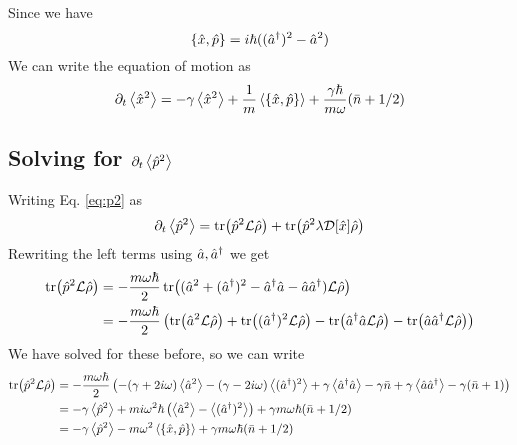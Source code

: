 Since we have
\begin{equation}
    \acomm{\xop}{\pop} = i\hbar ((\ad)^2 - \a^2)
\end{equation}
We can write the equation of motion as
\begin{equation}
    \dt\expval{\xop^2} = - \gamma \expval{\xop^2} + \frac{1}{m}\expval{\acomm{\xop}{\pop}} + \frac{\gamma \hbar}{m\omega}(\nbar + 1/2)
\end{equation}

\subsection{Solving for $\partial_t\expval{\hat{p}^2}$}
Writing Eq. \eqref{eq:p2} as 
\begin{equation}
    \partial_t\expval{\hat{p}^2} = \tr(\hat{p}^2 \mathcal{L}\hat{\rho}) + \tr(\hat{p}^2 \lambda \mathcal{D}[\hat{x}] \hat{\rho})\label{eq:p2b}
\end{equation}
Rewriting the left terms using $\hat{a},\hat{a}^{\dagger}$ we get
\begin{align}
    \tr(\hat{p}^2\mathcal{L}\hat{\rho}) &= -\frac{m\omega \hbar}{2} \tr((\hat{a}^2 + (\hat{a}^{\dagger})^2 - \hat{a}^{\dagger}\hat{a} - \hat{a}\hat{a}^{\dagger})\mathcal{L}\hat{\rho})\\
    &= -\frac{m\omega \hbar}{2} \left( \tr(\hat{a}^2\mathcal{L}\hat{\rho}) + \tr((\hat{a}^{\dagger})^2\mathcal{L}\hat{\rho}) - \tr(\hat{a}^{\dagger}\hat{a}\mathcal{L}\hat{\rho}) - \tr(\hat{a}\hat{a}^{\dagger}\mathcal{L}\hat{\rho}) \right)
\end{align}
We have solved for these before, so we can write 
\begin{align}
    \tr(\pop^2\liouvillian\dmatrix) &= -\frac{m\omega \hbar}{2} \left( -(\gamma + 2i\omega) \expval{\a^2} -(\gamma - 2i\omega) \expval{(\ad)^2} +\gamma \expval{\ad\a} - \gamma\nbar +\gamma \expval{\a\ad} - \gamma(\nbar + 1)  \right)\\
    &= -\gamma \expval{\pop^2} + m i\omega^2 \hbar \left( \expval{\a^2} - \expval{(\ad)^2} \right) + \gamma m \omega\hbar (\nbar + 1/2)\\
    &= -\gamma \expval{\pop^2} - m\omega^2 \expval{\acomm{\xop}{\pop}} + \gamma m \omega\hbar (\nbar + 1/2)
\end{align}

